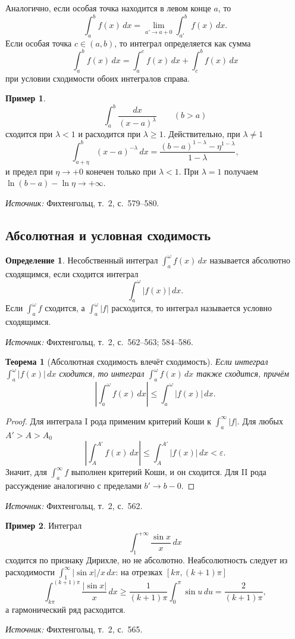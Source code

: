 \documentclass[12pt,a4paper]{article}
\newcommand{\eps}{\varepsilon}
\newcommand{\source}[1]{\par\noindent\textit{Источник:} #1.}
\theoremstyle{definition}
\newtheorem{definition}{Определение}[section]
\newtheorem{example}{Пример}[section]
\theoremstyle{plain}
\newtheorem{theorem}{Теорема}[section]
\theoremstyle{remark}
\begin{document}
Аналогично, если особая точка находится в левом конце \(a\), то
\[
\int_a^b f(x)\,dx=\lim_{a'\to a+0}\int_{a'}^b f(x)\,dx.
\]
Если особая точка \(c\in(a,b)\), то интеграл определяется как сумма
\[
\int_a^b f(x)\,dx=\int_a^c f(x)\,dx+\int_c^b f(x)\,dx
\]
при условии сходимости обоих интегралов справа.

\begin{example}
\[
\int_a^b\frac{dx}{(x-a)^\lambda}\qquad (b>a)
\]
сходится при \(\lambda<1\) и расходится при \(\lambda\ge1\). Действительно, при \(\lambda\ne1\)
\[
\int_{a+\eta}^b (x-a)^{-\lambda}\,dx
=
\frac{(b-a)^{1-\lambda}-\eta^{1-\lambda}}{1-\lambda},
\]
и предел при \(\eta\to+0\) конечен только при \(\lambda<1\). При \(\lambda=1\) получаем \(\ln(b-a)-\ln\eta\to+\infty\).
\end{example}
\source{Фихтенгольц, т.~2, с.~579--580}

\subsection{Абсолютная и условная сходимость}

\begin{definition}
Несобственный интеграл \(\int_a^\omega f(x)\,dx\) называется абсолютно сходящимся, если сходится интеграл
\[
\int_a^\omega |f(x)|\,dx.
\]
Если \(\int_a^\omega f\) сходится, а \(\int_a^\omega |f|\) расходится, то интеграл называется условно сходящимся.
\end{definition}
\source{Фихтенгольц, т.~2, с.~562--563; 584--586}

\begin{theorem}[Абсолютная сходимость влечёт сходимость]
Если интеграл \(\int_a^\omega |f(x)|\,dx\) сходится, то интеграл \(\int_a^\omega f(x)\,dx\) также сходится, причём
\[
\left|\int_a^\omega f(x)\,dx\right|\le \int_a^\omega |f(x)|\,dx.
\]
\end{theorem}

\begin{proof}
Для интеграла I рода применим критерий Коши к \(\int_a^\infty |f|\). Для любых \(A'>A>A_0\)
\[
\left|\int_A^{A'} f(x)\,dx\right|
\le
\int_A^{A'} |f(x)|\,dx<\eps.
\]
Значит, для \(\int_a^\infty f\) выполнен критерий Коши, и он сходится. Для II рода рассуждение аналогично с пределами \(b'\to b-0\).
\end{proof}
\source{Фихтенгольц, т.~2, с.~562}

\begin{example}
Интеграл
\[
\int_1^{+\infty}\frac{\sin x}{x}\,dx
\]
сходится по признаку Дирихле, но не абсолютно. Неабсолютность следует из расходимости \(\int_1^\infty |\sin x|/x\,dx\): на отрезках \([k\pi,(k+1)\pi]\)
\[
\int_{k\pi}^{(k+1)\pi}\frac{|\sin x|}{x}\,dx
\ge
\frac{1}{(k+1)\pi}\int_0^\pi \sin u\,du
=
\frac{2}{(k+1)\pi},
\]
а гармонический ряд расходится.
\end{example}
\source{Фихтенгольц, т.~2, с.~565}
\end{document}
